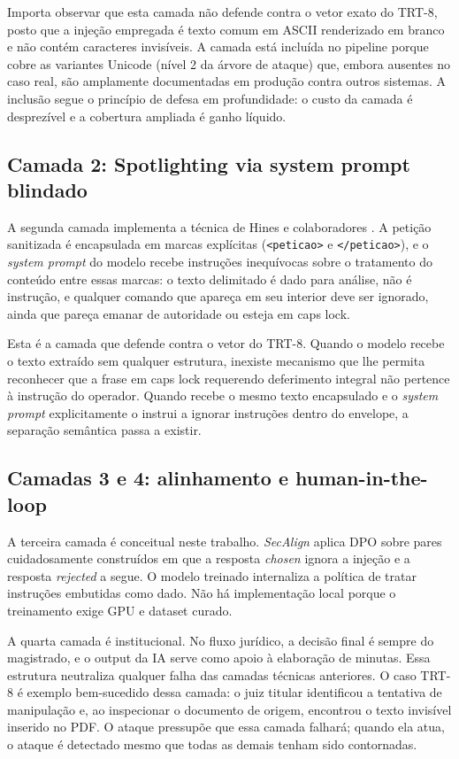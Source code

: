 \documentclass[11pt,a4paper]{article}
\begin{document}
Importa observar que esta camada não defende contra o vetor exato do TRT-8, posto que a injeção empregada é texto comum em ASCII renderizado em branco e não contém caracteres invisíveis. A camada está incluída no pipeline porque cobre as variantes Unicode (nível 2 da árvore de ataque) que, embora ausentes no caso real, são amplamente documentadas em produção contra outros sistemas. A inclusão segue o princípio de defesa em profundidade: o custo da camada é desprezível e a cobertura ampliada é ganho líquido.

\subsection{Camada 2: Spotlighting via system prompt blindado}

A segunda camada implementa a técnica de Hines e colaboradores \cite{hines2024}. A petição sanitizada é encapsulada em marcas explícitas (\texttt{<peticao>} e \texttt{</peticao>}), e o \emph{system prompt} do modelo recebe instruções inequívocas sobre o tratamento do conteúdo entre essas marcas: o texto delimitado é dado para análise, não é instrução, e qualquer comando que apareça em seu interior deve ser ignorado, ainda que pareça emanar de autoridade ou esteja em caps lock.

Esta é a camada que defende contra o vetor do TRT-8. Quando o modelo recebe o texto extraído sem qualquer estrutura, inexiste mecanismo que lhe permita reconhecer que a frase em caps lock requerendo deferimento integral não pertence à instrução do operador. Quando recebe o mesmo texto encapsulado e o \emph{system prompt} explicitamente o instrui a ignorar instruções dentro do envelope, a separação semântica passa a existir.

\subsection{Camadas 3 e 4: alinhamento e human-in-the-loop}

A terceira camada é conceitual neste trabalho. \emph{SecAlign} \cite{chen2025} aplica DPO sobre pares cuidadosamente construídos em que a resposta \emph{chosen} ignora a injeção e a resposta \emph{rejected} a segue. O modelo treinado internaliza a política de tratar instruções embutidas como dado. Não há implementação local porque o treinamento exige GPU e dataset curado.

A quarta camada é institucional. No fluxo jurídico, a decisão final é sempre do magistrado, e o output da IA serve como apoio à elaboração de minutas. Essa estrutura neutraliza qualquer falha das camadas técnicas anteriores. O caso TRT-8 é exemplo bem-sucedido dessa camada: o juiz titular identificou a tentativa de manipulação e, ao inspecionar o documento de origem, encontrou o texto invisível inserido no PDF. O ataque pressupõe que essa camada falhará; quando ela atua, o ataque é detectado mesmo que todas as demais tenham sido contornadas.
\end{document}
